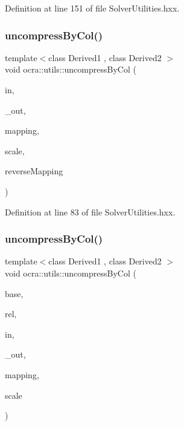 Definition at line 151 of file Solver\+Utilities.\+hxx.

\hypertarget{namespaceocra_1_1utils_adecf442a59dee26f5836a070533bcac4}{}\label{namespaceocra_1_1utils_adecf442a59dee26f5836a070533bcac4} 
\subsubsection{\texorpdfstring{uncompress\+By\+Col()}{uncompressByCol()}\hspace{0.1cm}{\footnotesize\ttfamily [1/2]}}
{\footnotesize\ttfamily template$<$class Derived1 , class Derived2 $>$ \\
void ocra\+::utils\+::uncompress\+By\+Col (\begin{DoxyParamCaption}\item[{const Matrix\+Base$<$ Derived1 $>$ \&}]{in,  }\item[{Matrix\+Base$<$ Derived2 $>$ const \&}]{\+\_\+out,  }\item[{const std\+::vector$<$ int $>$ \&}]{mapping,  }\item[{double}]{scale,  }\item[{bool}]{reverse\+Mapping }\end{DoxyParamCaption})\hspace{0.3cm}{\ttfamily [inline]}}



Definition at line 83 of file Solver\+Utilities.\+hxx.

\hypertarget{namespaceocra_1_1utils_ae2055de35b65215e1f23b0988fe20705}{}\label{namespaceocra_1_1utils_ae2055de35b65215e1f23b0988fe20705} 
\subsubsection{\texorpdfstring{uncompress\+By\+Col()}{uncompressByCol()}\hspace{0.1cm}{\footnotesize\ttfamily [2/2]}}
{\footnotesize\ttfamily template$<$class Derived1 , class Derived2 $>$ \\
void ocra\+::utils\+::uncompress\+By\+Col (\begin{DoxyParamCaption}\item[{const \hyperlink{classocra_1_1Variable}{Variable} \&}]{base,  }\item[{const \hyperlink{classocra_1_1Variable}{Variable} \&}]{rel,  }\item[{const Matrix\+Base$<$ Derived1 $>$ \&}]{in,  }\item[{Matrix\+Base$<$ Derived2 $>$ const \&}]{\+\_\+out,  }\item[{std\+::vector$<$ int $>$ \&}]{mapping,  }\item[{double}]{scale }\end{DoxyParamCaption})\hspace{0.3cm}{\ttfamily [inline]}}



